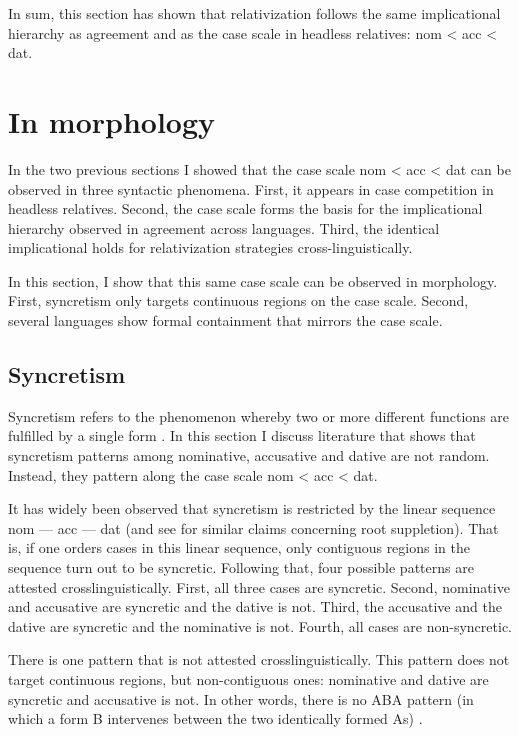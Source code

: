In sum, this section has shown that relativization follows the same implicational hierarchy as agreement and as the case scale in headless relatives: \ac{nom} < \ac{acc} < \ac{dat}.


\section{In morphology}\label{sec:case-morphology}

In the two previous sections I showed that the case scale \ac{nom} < \ac{acc} < \ac{dat} can be observed in three syntactic phenomena. First, it appears in case competition in headless relatives. Second, the case scale forms the basis for the implicational hierarchy observed in agreement across languages. Third, the identical implicational holds for relativization strategies cross-linguistically.

In this section, I show that this same case scale can be observed in morphology. First, syncretism only targets continuous regions on the case scale. Second, several languages show formal containment that mirrors the case scale.


\subsection{Syncretism}

Syncretism refers to the phenomenon whereby two or more different functions are fulfilled by a single form \citep[cf.][]{baerman2002}. In this section I discuss literature that shows that syncretism patterns among nominative, accusative and dative are not random. Instead, they pattern along the case scale \ac{nom} < \ac{acc} < \ac{dat}.

It has widely been observed that syncretism is restricted by the linear sequence \ac{nom} --- \ac{acc} --- \ac{dat} \citep{baerman2005,caha2009,zompi2017} (and see \citealt{mcfadden2018,smith2019} for similar claims concerning root suppletion). That is, if one orders cases in this linear sequence, only contiguous regions in the sequence turn out to be syncretic.
Following that, four possible patterns are attested crosslinguistically. First, all three cases are syncretic. Second, nominative and accusative are syncretic and the dative is not. Third, the accusative and the dative are syncretic and the nominative is not. Fourth, all cases are non-syncretic.

There is one pattern that is not attested crosslinguistically. This pattern does not target continuous regions, but non-contiguous ones: nominative and dative are syncretic and accusative is not. In other words, there is no ABA pattern (in which a form B intervenes between the two identically formed As) \citep{bobaljik2012}.


